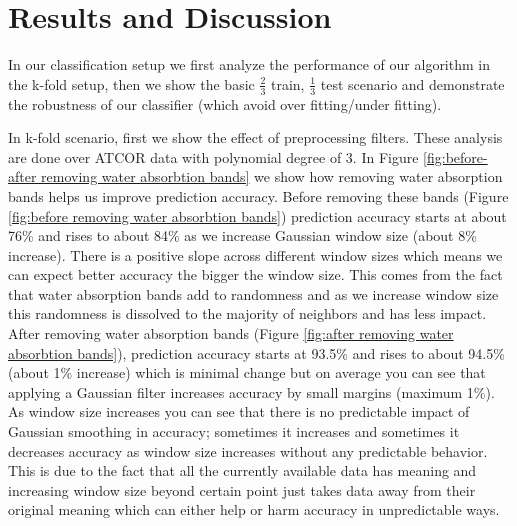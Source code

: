 \documentclass[remotesensing,article,accept,moreauthors,pdftex,12pt,a4paper]{mdpi}
\begin{document}
\section{Results and Discussion}

In our classification setup we first analyze the performance of our algorithm in the k-fold setup, then we show the basic $\frac{2}{3}$ train, $\frac{1}{3}$ test scenario and demonstrate the robustness of our classifier (which avoid over fitting/under fitting).

In k-fold scenario, first we show the effect of preprocessing filters. These analysis are done over ATCOR data with polynomial degree of 3. In Figure \ref{fig:before-after removing water absorbtion bands} we show how removing water absorption bands helps us improve prediction accuracy. Before removing these bands (Figure \ref{fig:before removing water absorbtion bands}) prediction accuracy starts at about 76\% and rises to about 84\% as we increase Gaussian window size (about 8\% increase). There is a positive slope across different window sizes which means we can expect better accuracy the bigger the window size. This comes from the fact that water absorption bands add to randomness and as we increase window size this randomness is dissolved to the majority of neighbors and has less impact. After removing water absorption bands (Figure \ref{fig:after removing water absorbtion bands}), prediction accuracy starts at 93.5\% and rises to about 94.5\% (about 1\% increase) which is minimal change but on average you can see that applying a Gaussian filter increases accuracy by small margins (maximum 1\%). As window size increases you can see that there is no predictable impact of Gaussian smoothing in accuracy; sometimes it increases and sometimes it decreases accuracy as window size increases without any predictable behavior. This is due to the fact that all the currently available data has meaning and increasing window size beyond certain point just takes data away from their original meaning which can either help or harm accuracy in unpredictable ways. 
\end{document}
